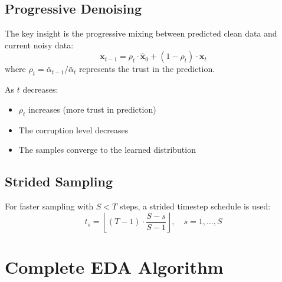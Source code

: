 \documentclass[11pt,a4paper]{article}
\newcommand{\vx}{\mathbf{x}}
\begin{document}
\subsection{Progressive Denoising}

The key insight is the progressive mixing between predicted clean data and current noisy data:
\begin{equation}
    \vx_{t-1} = \rho_t \cdot \hat{\vx}_0 + (1 - \rho_t) \cdot \vx_t
\end{equation}
where $\rho_t = \bar{\alpha}_{t-1}/\bar{\alpha}_t$ represents the trust in the prediction.

As $t$ decreases:
\begin{itemize}
    \item $\rho_t$ increases (more trust in prediction)
    \item The corruption level decreases
    \item The samples converge to the learned distribution
\end{itemize}

\subsection{Strided Sampling}

For faster sampling with $S < T$ steps, a strided timestep schedule is used:
\begin{equation}
    t_s = \left\lfloor (T-1) \cdot \frac{S - s}{S - 1} \right\rfloor, \quad s = 1, \ldots, S
\end{equation}

\section{Complete EDA Algorithm}
\end{document}
